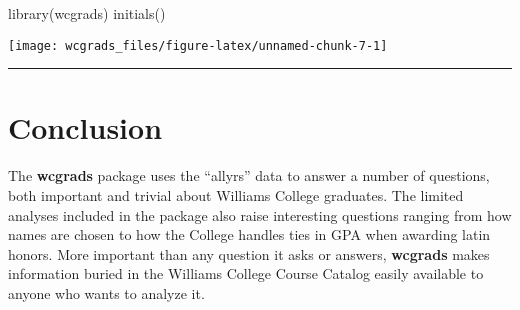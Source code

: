 \begin{Schunk}
\begin{Sinput}
library(wcgrads)
initials()
\end{Sinput}

\texttt{[image: wcgrads\_files/figure-latex/unnamed-chunk-7-1]} \end{Schunk}

\begin{center}\rule{0.5\linewidth}{\linethickness}\end{center}

\section{Conclusion}\label{conclusion}

The \textbf{wcgrads} package uses the ``allyrs'' data to answer a number
of questions, both important and trivial about Williams College
graduates. The limited analyses included in the package also raise
interesting questions ranging from how names are chosen to how the
College handles ties in GPA when awarding latin honors. More important
than any question it asks or answers, \textbf{wcgrads} makes information
buried in the Williams College Course Catalog easily available to anyone
who wants to analyze it.

\address{%
Ben Czekanski\\
\\
\\
}


